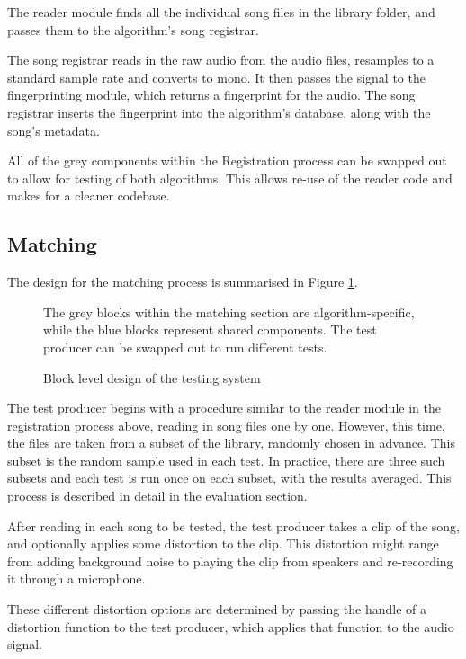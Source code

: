 \documentclass[12pt,a4paper,twoside,openright]{report}
\begin{document}
The reader module finds all the individual song files in the library folder, and passes them to the algorithm's song registrar.

The song registrar reads in the raw audio from the audio files, resamples to a standard sample rate and converts to mono. It then passes the signal to the fingerprinting module, which returns a fingerprint for the audio. The song registrar inserts the fingerprint into the algorithm's database, along with the song's metadata.

All of the grey components within the Registration process can be swapped out to allow for testing of both algorithms. This allows re-use of the reader code and makes for a cleaner codebase. %



\subsection{Matching}


The design for the matching process is summarised in Figure \ref{figs:matching_design}. 

\begin{figure}[h]
  \centering
  
  \caption{Block level design of the testing system}
  \label{figs:matching_design}
  \medskip \small
  The grey blocks within the matching section are algorithm-specific, while the blue blocks represent shared components. The test producer can be swapped out to run different tests.
\end{figure}

The test producer begins with a procedure similar to the reader module in the registration process above, reading in song files one by one. However, this time, the files are taken from a subset of the library, randomly chosen in advance. This subset is the random sample used in each test. In practice, there are three such subsets and each test is run once on each subset, with the results averaged. This process is described in detail in the evaluation section.

After reading in each song to be tested, the test producer takes a clip of the song, and optionally applies some distortion to the clip. This distortion might range from adding background noise to playing the clip from speakers and re-recording it through a microphone.

These different distortion options are determined by passing the handle of a distortion function to the test producer, which applies that function to the audio signal.
\end{document}
